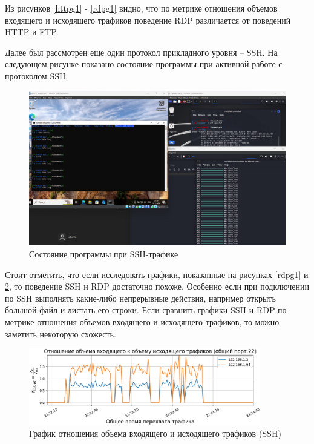 \documentclass[spec, och, diploma]{SCWorks}
\begin{document}
Из рисунков \ref{httpg1} - \ref{rdpg1} видно, что по метрике отношения объемов входящего и исходящего трафиков поведение RDP различается
от поведений HTTP и FTP.

Далее был рассмотрен еще один протокол прикладного уровня -- SSH. На следующем рисунке показано состояние программы при активной работе
с протоколом SSH.

\begin{figure}[H]
  \centering
  \includegraphics[width=1.0\textwidth]{pics/new5.png}
  \caption{Состояние программы при SSH-трафике}
  \label{ssh1}
\end{figure}


Стоит отметить, что если исследовать графики, показанные на рисунках \ref{rdpg1} и \ref{sshg1}, то поведение SSH и RDP достаточно похоже. 
Особенно если при подключении по SSH выполнять какие-либо непрерывные действия, например открыть большой файл и листать его строки. 
Если сравнить графики SSH и RDP по метрике отношения объемов входящего и исходящего трафиков, то можно заметить некоторую схожесть.

\begin{figure}[H]
  \centering
  \includegraphics[width=0.9\textwidth]{pics/newssh1.png}
  \caption{График отношения объема входящего и исходящего трафиков (SSH)}
  \label{sshg1}
\end{figure}
\end{document}
